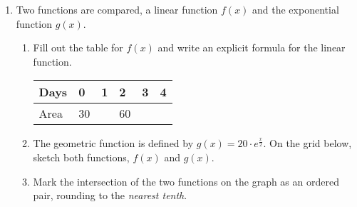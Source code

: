 \documentclass[12pt, twoside]{article}
\begin{document}
\begin{enumerate}
\item Two functions are compared, a linear function $f(x)$ and the exponential function $g(x)$.
\begin{enumerate}%
    \item Fill out the table for $f(x)$ and write an explicit formula for the linear function.
    \begin{center}
    \begin{tabular}{|p{1cm}|p{1cm}|p{1cm}|p{1cm}|p{1cm}|p{1cm}|}
        \hline
        Days & 0 & 1 & 2 & 3 & 4 \\
        \hline
        Area & 30 & & 60 & & \\[0.25cm]
        \hline
    \end{tabular}
    \end{center} \vspace{2cm}
    \item The geometric function is defined by $\displaystyle g(x) = 20 \cdot e^{\frac{x}{2}}$. On the grid below, sketch both functions, $f(x)$ and $g(x)$.
    \begin{center}
        \end{center}
    \item Mark the intersection of the two functions on the graph as an ordered pair, rounding to the \emph{nearest tenth}.
\end{enumerate}


\end{enumerate}
\end{document}
